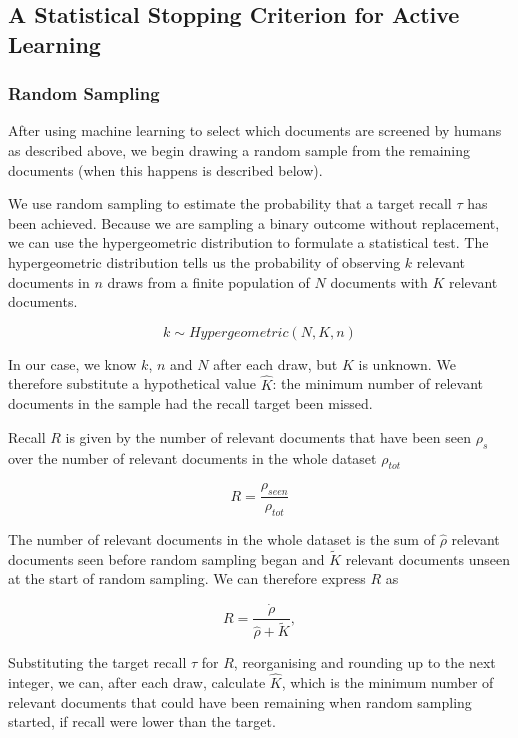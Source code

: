 \documentclass{bmcart}
\begin{document}
\subsection*{A Statistical Stopping Criterion for Active Learning}

	\subsubsection*{Random Sampling}
	
	After using machine learning to select which documents are screened by humans as described above, we begin drawing a random sample from the remaining documents (when this happens is described below). 

	We use random sampling to estimate the probability that a target recall $\tau$ has been achieved. Because we are sampling a binary outcome without replacement, we can use the hypergeometric distribution to formulate a statistical test. The hypergeometric distribution tells us the probability of observing $k$ relevant documents in $n$ draws from a finite population of $N$ documents with $K$ relevant documents. 
	
	\begin{equation}
		k \sim Hypergeometric(N, K, n)
	\end{equation}
	
	In our case, we know $k$, $n$ and $N$ after each draw, but $K$ is unknown. We therefore substitute a hypothetical value $\hat{K}$: the minimum number of relevant documents in the sample had the recall target been missed.
	
	Recall $R$ is given by the number of relevant documents that have been seen $\rho_{s}$ over the number of relevant documents in the whole dataset $\rho_{tot}$
	
	\begin{equation}
		R = \frac{\rho_{seen}}{\rho_{tot}}
	\end{equation}
	
	The number of relevant documents in the whole dataset is the sum of $\hat{\rho}$ relevant documents seen before random sampling began and $\tilde{K}$ relevant documents unseen at the start of random sampling. We can therefore express $R$ as
	
	\begin{equation}
		R = \frac{\dot{\rho}}{\hat{\rho} + \tilde{K}},
	\end{equation}
	
	Substituting the target recall $\tau$ for $R$, reorganising and rounding up to the next integer, we can, after each draw, calculate $\hat{K}$, which is the minimum number of relevant documents that could have been remaining when random sampling started, if recall were lower than the target.
	
\end{document}
